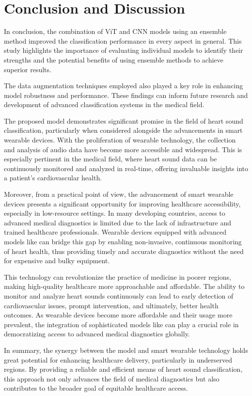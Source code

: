 \section{Conclusion and Discussion} \label{conclusion}
In conclusion, the combination of ViT and CNN models using an ensemble method improved the classification performance in every aspect in general. This study highlights the importance of evaluating individual models to identify their strengths and the potential benefits of using ensemble methods to achieve superior results. 

The data augmentation techniques employed also played a key role in enhancing model robustness and performance. These findings can inform future research and development of advanced classification systems in the medical field.

The proposed \ENACT model demonstrates significant promise in the field of heart sound classification, particularly when considered alongside the advancements in smart wearable devices. With the proliferation of wearable technology, the collection and analysis of audio data have become more accessible and widespread. This is especially pertinent in the medical field, where heart sound data can be continuously monitored and analyzed in real-time, offering invaluable insights into a patient's cardiovascular health.

Moreover, from a practical point of view, the advancement of smart wearable devices presents a significant opportunity for improving healthcare accessibility, especially in low-resource settings. In many developing countries, access to advanced medical diagnostics is limited due to the lack of infrastructure and trained healthcare professionals. Wearable devices equipped with advanced models like \ENACT can bridge this gap by enabling non-invasive, continuous monitoring of heart health, thus providing timely and accurate diagnostics without the need for expensive and bulky equipment.

This technology can revolutionize the practice of medicine in poorer regions, making high-quality healthcare more approachable and affordable. The ability to monitor and analyze heart sounds continuously can lead to early detection of cardiovascular issues, prompt intervention, and ultimately, better health outcomes. As wearable devices become more affordable and their usage more prevalent, the integration of sophisticated models like \ENACT can play a crucial role in democratizing access to advanced medical diagnostics globally.

In summary, the synergy between the \ENACT model and smart wearable technology holds great potential for enhancing healthcare delivery, particularly in underserved regions. By providing a reliable and efficient means of heart sound classification, this approach not only advances the field of medical diagnostics but also contributes to the broader goal of equitable healthcare access.